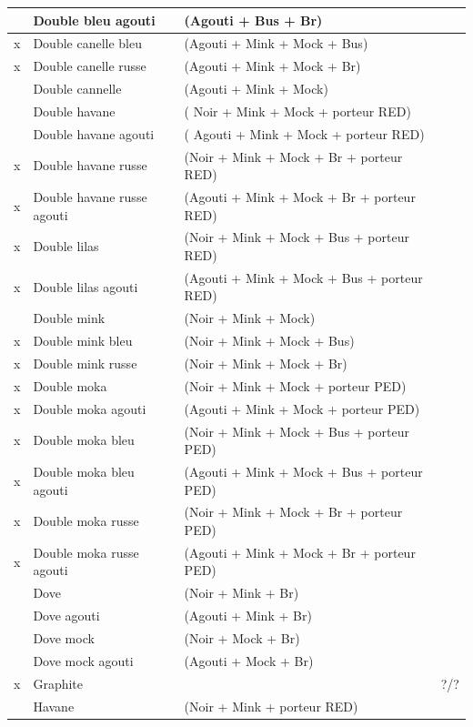 ﻿\documentclass[a4paper,10pt]{article}
\begin{document}
\begin{longtable}{|c|l|l|l|}
& Double bleu agouti  & (Agouti + Bus + Br) & \\\hline
x & Double canelle bleu  & (Agouti + Mink +   Mock + Bus) & \\\hline
x & Double canelle russe  & (Agouti + Mink + Mock + Br) & \\\hline
& Double cannelle  & (Agouti + Mink + Mock) & \\\hline
& Double havane  & ( Noir + Mink + Mock +   porteur RED) & \\\hline
& Double havane agouti  & ( Agouti + Mink +   Mock + porteur RED) & \\\hline
x & Double havane russe  & (Noir + Mink + Mock   + Br + porteur RED) & \\\hline
x & Double havane russe agouti  & (Agouti +   Mink + Mock + Br + porteur RED) & \\\hline
x & Double lilas  & (Noir + Mink + Mock + Bus +   porteur RED) & \\\hline
x & Double lilas agouti  & (Agouti + Mink +   Mock + Bus + porteur RED) & \\\hline
& Double mink  & (Noir + Mink + Mock) & \\\hline
x & Double mink bleu  & (Noir + Mink + Mock +   Bus) & \\\hline
x & Double mink russe  & (Noir + Mink + Mock +   Br) & \\\hline
x & Double moka  & (Noir + Mink + Mock +   porteur PED) & \\\hline
x & Double moka agouti  & (Agouti + Mink + Mock   + porteur PED) & \\\hline
x & Double moka bleu  & (Noir + Mink + Mock +   Bus + porteur PED) & \\\hline
x & Double moka bleu agouti  & (Agouti + Mink +   Mock + Bus + porteur PED) & \\\hline
x & Double moka russe  & (Noir + Mink + Mock +   Br + porteur PED) & \\\hline
x & Double moka russe agouti  & (Agouti + Mink   + Mock + Br + porteur PED) & \\\hline
& Dove  & (Noir + Mink + Br) & \\\hline
& Dove agouti    & (Agouti + Mink + Br) & \\\hline
& Dove mock  & (Noir + Mock + Br) & \\\hline
& Dove mock agouti    & (Agouti + Mock + Br) & \\\hline
x & Graphite & & ?/? \\\hline
& Havane  & (Noir + Mink + porteur RED) & \\\hline

\end{longtable}
\end{document}

